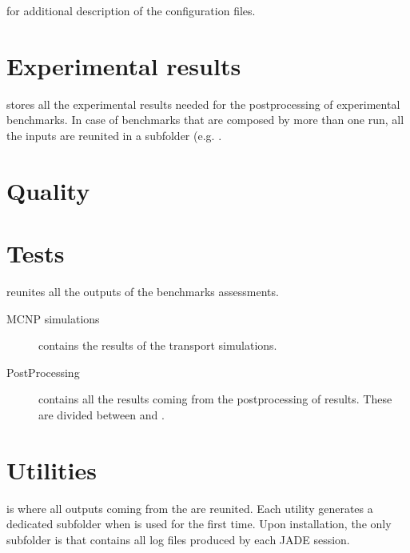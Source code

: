 \documentclass[letterpaper,10pt,english]{sphinxmanual}
\begin{document}


{\hyperref[\detokenize{usage/configuration:config}]{}} for additional description of the configuration files.




\section{Experimental results}
\label{\detokenize{usage/folders:experimental-results}}
 stores all the experimental results needed for the post\sphinxhyphen{}processing of
experimental benchmarks. In case of benchmarks that are composed by more than one run, all the inputs are reunited in a sub\sphinxhyphen{}folder
(e.g. .


\section{Quality}
\label{\detokenize{usage/folders:quality}}


\section{Tests}
\label{\detokenize{usage/folders:tests}}
 reunites all the outputs of the benchmarks assessments.
\begin{description}
\item[{MCNP simulations}] \leavevmode
contains the results of the transport simulations.

\item[{Post\sphinxhyphen{}Processing}] \leavevmode
contains all the results coming from the post\sphinxhyphen{}processing of results. These are divided between
 and .

\end{description}


\section{Utilities}
\label{\detokenize{usage/folders:utilities}}
 is where all outputs coming from the {\hyperref[\detokenize{usage/utilities:uty}]{}} are reunited. Each utility generates
a dedicated sub\sphinxhyphen{}folder when is used for the first time. Upon installation, the only sub\sphinxhyphen{}folder is
 that contains all log files produced by each JADE session.
\end{document}
